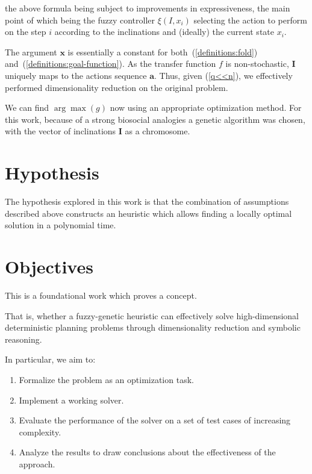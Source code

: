 \documentclass[12pt, a4paper]{report}
\begin{document}
	the above formula being subject to improvements in expressiveness,
	the main point of which being the fuzzy controller $\xi(I, x_i)$ selecting the action to perform on the step $i$ according to the inclinations and (ideally) the current state $x_i$.
	
	The argument $\mathbf{x}$ is essentially a constant for both~(\ref{definitions:fold}) and~(\ref{definitions:goal-function}).
	As the transfer function $f$ is non-stochastic, $\mathbf{I}$ uniquely maps to the actions sequence $\mathbf{a}$.
	Thus, given (\ref{q<<n}), we effectively performed dimensionality reduction on the original problem.
		
	We can find $\arg \max(g)$ now using an appropriate optimization method.
	For this work, because of a strong biosocial analogies a genetic algorithm\cite{mitchell1999geneticalgorithms} was chosen,
	with the vector of inclinations $\mathbf{I}$ as a chromosome.
	
	\section{Hypothesis}
	The hypothesis explored in this work is that the combination of assumptions described above constructs an heuristic which allows finding a locally optimal solution in a polynomial time.
	
	\section{Objectives}\label{section::objectives}
	
	This is a foundational work which proves a concept.
	
	That is, whether a fuzzy-genetic heuristic can effectively solve high-dimensional deterministic planning problems through dimensionality reduction and symbolic reasoning.
	
	In particular, we aim to:
	\begin{enumerate}
		\item\label{goal::formal-problem-statement} Formalize the problem as an optimization task.
		\item\label{goal::working-solver} Implement a working solver.
		\item\label{goal::performance-evaluation} Evaluate the performance of the solver on a set of test cases of increasing complexity.
		\item\label{goal::conclusions} Analyze the results to draw conclusions about the effectiveness of the approach.
	\end{enumerate}
\end{document}
